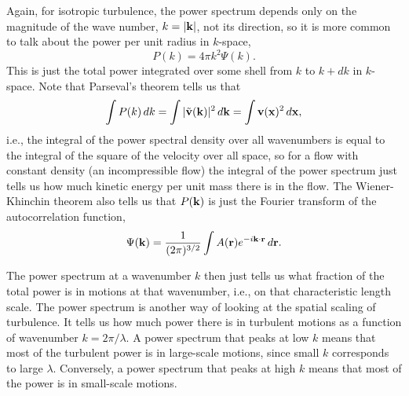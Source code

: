 Again, for isotropic turbulence, the power spectrum depends only on the magnitude of the wave number, $k=|\mathbf{k}|$, not its direction, so it is more common to talk about the power per unit radius in $k$-space,
\begin{equation}
P(k) = 4\pi k^2 \Psi(k).
\end{equation}
This is just the total power integrated over some shell from $k$ to $k+dk$ in $k$-space. Note that Parseval's theorem tells us that
\begin{equation}
\int P(k)\, dk = \int | \tilde{\mathbf{v}}(\mathbf{k})|^2 \, d\mathbf{k} = \int \mathbf{v}(\mathbf{x})^2 \, d\mathbf{x},
\end{equation}
i.e., the integral of the power spectral density over all wavenumbers is equal to the integral of the square of the velocity over all space, so for a flow with constant density (an incompressible flow) the integral of the power spectrum just tells us how much kinetic energy per unit mass there is in the flow. The Wiener-Khinchin theorem also tells us that $P(\mathbf{k})$ is just the Fourier transform of the autocorrelation function,
\begin{equation}
\Psi(\mathbf{k}) = \frac{1}{(2\pi)^{3/2}} \int A(\mathbf{r}) e^{-i\mathbf{k}\cdot\mathbf{r}} \,d\mathbf{r}.
\end{equation}

The power spectrum at a wavenumber $k$ then just tells us what fraction of the total power is in motions at that wavenumber, i.e., on that characteristic length scale. The power spectrum is another way of looking at the spatial scaling of turbulence. It tells us how much power there is in turbulent motions as a function of wavenumber $k=2\pi/\lambda$. A power spectrum that peaks at low $k$ means that most of the turbulent power is in large-scale motions, since small $k$ corresponds to large $\lambda$. Conversely, a power spectrum that peaks at high $k$ means that most of the power is in small-scale motions.

